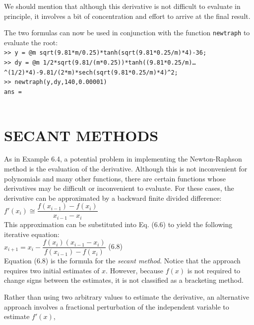 \documentclass[../main.tex]{subfiles}
\begin{document}
\begin{example}
    \noindent We should mention that although this derivative is not difficult to evaluate in principle, it
    involves a bit of concentration and effort to arrive at the final result.
    
    The two formulas can now be used in conjunction with the function \texttt{newtraph} to
    evaluate the root:\\

    \texttt{>> y = @m sqrt(9.81*m/0.25)*tanh(sqrt(9.81*0.25/m)*4)-36;\\
    \indent >> dy = @m 1/2*sqrt(9.81/(m*0.25))*tanh((9.81*0.25/m)\ldots\\
    \indent\indent \textasciicircum(1/2)*4)-9.81/(2*m)*sech(sqrt(9.81*0.25/m)*4)\textasciicircum2;\\
    \indent >> newtraph(y,dy,140,0.00001)\\
    \indent ans =\\
    \indent{}\\}
\end{example}
\bigskip

\section[SECANT METHODS]{SECANT METHODS}
\noindent As in Example 6.4, a potential problem in implementing the Newton-Raphson method is
the evaluation of the derivative. Although this is not inconvenient for polynomials and
many other functions, there are certain functions whose derivatives may be difficult or
inconvenient to evaluate. For these cases, the derivative can be approximated by a backward
finite divided difference:\\

$f'(x_i)\cong \dfrac{f(x_{i-1})-f(x_i)}{x_{i-1}-x_i}$\\

\noindent This approximation can be substituted into Eq. (6.6) to yield the following iterative
equation:\\

$x_{i+1} = x_i - \dfrac{f(x_i)(x_{i-1}-x_i)}{f(x_{i-1})-f(x_i)}$
\hfill (6.8)\\

Equation (6.8) is the formula for the \emph{secant method}. Notice that the approach requires two
initial estimates of $x$. However, because $f (x)$ is not required to change signs between the
estimates, it is not classified as a bracketing method.

Rather than using two arbitrary values to estimate the derivative, an alternative approach
involves a fractional perturbation of the independent variable to estimate $f'(x)$,\\
\end{document}
